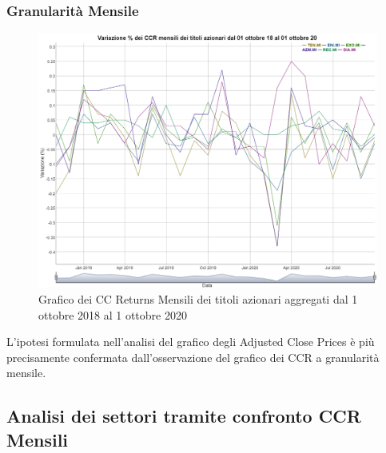 \documentclass[12pt]{article}
\begin{document}
\subsubsection{Granularità Mensile}
\begin{figure}[!htb]
    \centering
    \includegraphics[width=1\textwidth]{immagini/CCRm.png}
    \caption{Grafico dei CC Returns Mensili dei titoli azionari aggregati dal 1 ottobre 2018 al 1 ottobre 2020}
\end{figure}
\FloatBarrier
L'ipotesi formulata nell'analisi del grafico degli Adjusted Close Prices è più precisamente confermata dall'osservazione del grafico dei CCR a granularità mensile.
\newpage
\subsection{Analisi dei settori tramite confronto CCR Mensili}
\end{document}
